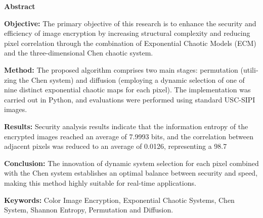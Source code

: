 \documentclass[a4paper,12pt]{report}
\renewcommand{\%}{\lr{\oldpercent}}
\begin{document}
\begin{latin}
\begin{center}
    {\Large \textbf{Abstract}}
\end{center}
\vspace{0.5cm}

\textbf{Objective:} The primary objective of this research is to enhance the security and efficiency of image encryption by increasing structural complexity and reducing pixel correlation through the combination of Exponential Chaotic Models (ECM) and the three-dimensional Chen chaotic system.

\textbf{Method:} The proposed algorithm comprises two main stages: permutation (utilizing the Chen system) and diffusion (employing a dynamic selection of one of nine distinct exponential chaotic maps for each pixel). The implementation was carried out in Python, and evaluations were performed using standard USC-SIPI images.

\textbf{Results:} Security analysis results indicate that the information entropy of the encrypted images reached an average of 7.9993 bits, and the correlation between adjacent pixels was reduced to an average of 0.0126, representing a 98.7%

\textbf{Conclusion:} The innovation of dynamic system selection for each pixel combined with the Chen system establishes an optimal balance between security and speed, making this method highly suitable for real-time applications.

\vspace{1cm}
\textbf{Keywords:} Color Image Encryption, Exponential Chaotic Systems, Chen System, Shannon Entropy, Permutation and Diffusion.
\end{latin}
\newpage

\newpage
\end{document}
